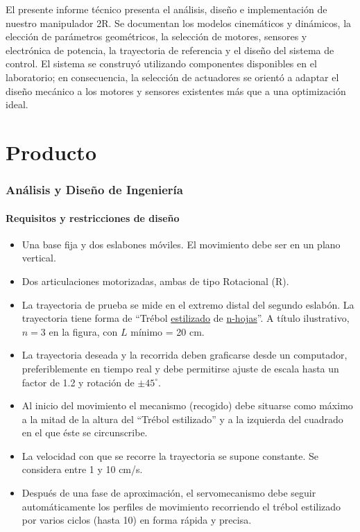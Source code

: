 \documentclass[11pt,a4paper]{article}
\begin{document}
El presente informe técnico presenta el análisis, diseño e implementación de nuestro manipulador 2R. Se documentan los modelos cinemáticos y dinámicos, la elección de parámetros geométricos, la selección de motores, sensores y electrónica de potencia, la trayectoria de referencia y el diseño del sistema de control.  El sistema se construyó utilizando componentes disponibles en el laboratorio; en consecuencia, la selección de actuadores se orientó a adaptar el diseño mecánico a los motores y sensores existentes más que a una optimización ideal.

\part{Producto}

\section{Análisis y Diseño de Ingeniería}

\subsection{Requisitos y restricciones de diseño}

\begin{itemize}
  \item Una base fija y dos eslabones móviles. El movimiento debe ser en un plano vertical.
  \item Dos articulaciones motorizadas, ambas de tipo Rotacional (R).
  \item La trayectoria de prueba se mide en el extremo distal del segundo eslabón. 
        La trayectoria tiene forma de ``Trébol \underline{estilizado} de \underline{n-hojas}''. 
        A título ilustrativo, \(n = 3\) en la figura, con \(L\) mínimo = 20 cm.
  \item La trayectoria deseada y la recorrida deben graficarse desde un computador, 
        preferiblemente en tiempo real y debe permitirse ajuste de escala hasta un 
        factor de 1.2 y rotación de \(\pm 45^\circ\).
  \item Al inicio del movimiento el mecanismo (recogido) debe situarse como máximo 
        a la mitad de la altura del ``Trébol estilizado'' y a la izquierda del cuadrado 
        en el que éste se circunscribe.
  \item La velocidad con que se recorre la trayectoria se supone constante. 
        Se considera entre 1 y 10 cm/s.
  \item Después de una fase de aproximación, el servomecanismo debe seguir 
        automáticamente los perfiles de movimiento recorriendo el trébol estilizado 
        por varios ciclos (hasta 10) en forma rápida y precisa.
\end{itemize}
\end{document}
